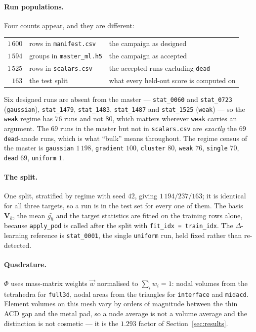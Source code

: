\documentclass[11pt,a4paper]{article}
\newcommand{\vect}[1]{\mathbf{#1}}
\theoremstyle{plain}
\theoremstyle{definition}
\theoremstyle{remark}
\begin{document}
\paragraph{Run populations.} Four counts appear, and they are different:
\begin{center}
\small
\begin{tabular}{@{}rll@{}}
\toprule
$1\,600$ & rows in \texttt{manifest.csv} & the campaign as designed \\
$1\,594$ & groups in \texttt{master\_ml.h5} & the campaign as accepted \\
$1\,525$ & rows in \texttt{scalars.csv} & the accepted runs excluding \texttt{dead} \\
$163$    & the test split & what every held-out score is computed on \\
\bottomrule
\end{tabular}
\end{center}
Six designed runs are absent from the master --- \texttt{stat\_0060} and
\texttt{stat\_0723} (\texttt{gaussian}), \texttt{stat\_1479},
\texttt{stat\_1483}, \texttt{stat\_1487} and \texttt{stat\_1525}
(\texttt{weak}) --- so the \texttt{weak} regime has $76$ runs and not $80$,
which matters wherever \texttt{weak} carries an argument. The $69$ runs in the
master but not in \texttt{scalars.csv} are \emph{exactly} the $69$
\texttt{dead}-anode runs, which is what ``bulk'' means throughout. The regime
census of the master is
\texttt{gaussian} $1\,198$, \texttt{gradient} $100$, \texttt{cluster} $80$,
\texttt{weak} $76$, \texttt{single} $70$, \texttt{dead} $69$,
\texttt{uniform} $1$.

\paragraph{The split.} One split, stratified by regime with seed $42$, giving
$1\,194/237/163$; it is identical for all three targets, so a run is in the test
set for every one of them. The basis $\vect{V}_k$, the mean $\bar{g_h}$ and the
target statistics are fitted on the training rows alone, because
\texttt{apply\_pod} is called after the split with
\texttt{fit\_idx = train\_idx}. The $\Delta$-learning reference is
\texttt{stat\_0001}, the single \texttt{uniform} run, held fixed rather than
re-detected.

\paragraph{Quadrature.} $\Phi$ uses mass-matrix weights $\vec w$ normalised to
$\sum_i w_i = 1$: nodal volumes from the tetrahedra for \texttt{full3d}, nodal
areas from the triangles for \texttt{interface} and \texttt{midacd}. Element
volumes on this mesh vary by orders of magnitude between the thin ACD gap and
the metal pad, so a node average is not a volume average and the distinction is
not cosmetic --- it is the $1.293$ factor of
Section~\ref{sec:results}.
\end{document}
